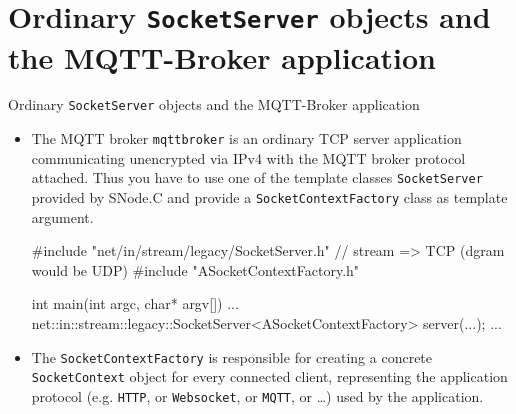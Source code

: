 \section[nosectionpage]{Ordinary \texttt{SocketServer} objects and the MQTT-Broker application}

\begin{frame}[fragile]{Ordinary \texttt{SocketServer} objects and the MQTT-Broker application}
  \begin{itemize}
    \item The MQTT broker \texttt{\textcolor{fh-ooe-red}{mqttbroker}} is an ordinary \textcolor{fh-ooe-red}{TCP server} application communicating \textcolor{fh-ooe-red}{unencrypted} via \textcolor{fh-ooe-red}{IPv4} with the MQTT broker protocol attached.
    Thus you have to use one of the \textcolor{fh-ooe-red}{template classes \texttt{SocketServer}} provided by SNode.C and provide a \texttt{\textcolor{fh-ooe-red}{SocketContextFactory}} class as \textcolor{fh-ooe-red}{template argument}.

    \begin{cppcode}[gobble=4]
      #include "net/in/stream/legacy/SocketServer.h" // stream => TCP (dgram would be UDP)
      #include "ASocketContextFactory.h"

      int main(int argc, char* argv[]) {
        ...
        net::in::stream::legacy::SocketServer<ASocketContextFactory> server(...);
        ...
      }
    \end{cppcode}
    \item The \texttt{\textcolor{fh-ooe-red}{SocketContextFactory}} is responsible for \textcolor{fh-ooe-red}{creating} a concrete \texttt{\textcolor{fh-ooe-red}{SocketContext}} object for \textcolor{fh-ooe-red}{every connected client}, \textcolor{fh-ooe-red}{representing} the \textcolor{fh-ooe-red}{application protocol} (e.g. \texttt{\textcolor{fh-ooe-red}{HTTP}}, or \texttt{\textcolor{fh-ooe-red}{Websocket}}, or \texttt{\textcolor{fh-ooe-red}{MQTT}}, or \ldots) used by the application.
  \end{itemize}
\end{frame}
